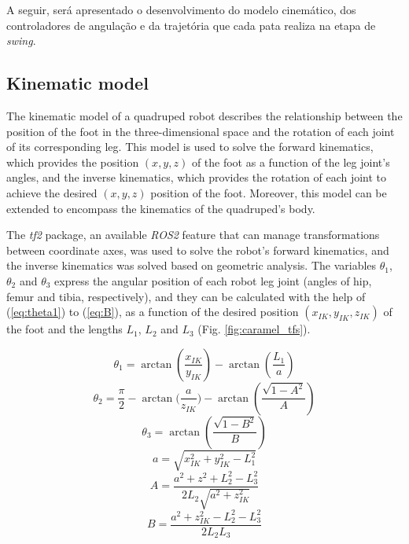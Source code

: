 \documentclass[conference]{IEEEtran}
\begin{document}
A seguir, será apresentado o desenvolvimento do modelo cinemático, dos controladores de angulação e da trajetória que cada pata realiza na etapa de \textit{swing}.

\subsection{Kinematic model}
\label{sec:detail_inv_kinematics}

The kinematic model of a quadruped robot describes the relationship between the position of the foot in the three-dimensional space and the rotation of each joint of its corresponding leg. This model is used to solve the forward kinematics, which provides the position $(x, y, z)$ of the foot as a function of the leg joint's angles, and the inverse kinematics, which provides the rotation of each joint to achieve the desired $(x, y, z)$ position of the foot. Moreover, this model can be extended to encompass the kinematics of the quadruped's body.

The \textit{tf2} package, an available \textit{ROS2} feature that can manage transformations between coordinate axes, was used to solve the robot's forward kinematics, and the inverse kinematics was solved based on geometric analysis. The variables $\theta_1$, $\theta_2$ and $\theta_3$ express the angular position of each robot leg joint (angles of hip, femur and tibia, respectively), and they can be calculated with the help of (\ref{eq:theta1}) to (\ref{eq:B}), as a function of the desired position $(x_{IK}, y_{IK}, z_{IK})$ of the foot and the lengths $L_1$, $L_2$ and $L_3$ (Fig. \ref{fig:caramel_tfs}).

\begin{equation}
  \label{eq:theta1}
  \theta_1 = \arctan{(\frac{x_{IK}}{y_{IK}})} - \arctan{(\frac{L_1}{a})}
\end{equation}
\begin{equation}
  \label{eq:theta2}
  \theta_2 = \frac{\pi}{2} - \arctan{(\frac{a}{z_{IK}}}) - \arctan{(\frac{\sqrt{1-A^2}}{A})}
\end{equation}
\begin{equation}
  \label{eq:theta3}
  \theta_3 = \arctan(\frac{\sqrt{1-B^2}}{B})
\end{equation}
\begin{equation}
  \label{eq:a}
  a = \sqrt{x_{IK}^2+y_{IK}^2-L_1^2}
\end{equation}
\begin{equation}
  \label{eq:A}
  A =\frac{a^2+z^2+L_2^2-L_3^2}{2L_2\sqrt{a^2+z_{IK}^2}}
\end{equation}
\begin{equation}
  \label{eq:B}
  B = \frac{a^2+z_{IK}^2-L_2^2-L_3^2}{2L_2L_3}
\end{equation}
\end{document}
